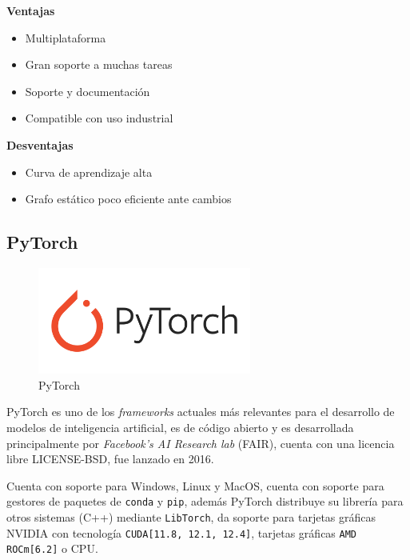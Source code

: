\begin{minipage}[t]{0.45\textwidth}
    \centering
    \textbf{Ventajas} \\[1ex]
    \begin{itemize}
        \item Multiplataforma
        \item Gran soporte a muchas tareas
        \item Soporte y documentación
        \item Compatible con uso industrial
    \end{itemize}
\end{minipage}%
\hfill
\begin{minipage}[t]{0.45\textwidth}
    \centering
    \textbf{Desventajas} \\[1ex]
    \begin{itemize}
        \item Curva de aprendizaje alta
        \item Grafo estático poco eficiente ante cambios
    \end{itemize}
\end{minipage}

\subsection{PyTorch}

\begin{figure}[H]
    \centering
    \includegraphics[width=7cm]{figures/assets/Logo_PyTorch.png}
    \caption{PyTorch}
    \label{fig:lib-pytorch}
\end{figure}

PyTorch \cite{Ansel_PyTorch_2_Faster_2024} es uno de los \textit{frameworks} actuales más relevantes para el desarrollo de modelos de inteligencia artificial, es de código abierto y es desarrollada principalmente por \textit{Facebook's AI Research lab} (FAIR), cuenta con una licencia libre \gls{LICENSE-BSD}, fue lanzado en 2016. 

Cuenta con soporte para Windows, Linux y MacOS, cuenta con soporte para gestores de paquetes de \texttt{conda} y \texttt{pip}, además PyTorch distribuye su librería para otros sistemas (C++) mediante \texttt{LibTorch}, da soporte para tarjetas gráficas NVIDIA con tecnología \texttt{CUDA[11.8, 12.1, 12.4]}, tarjetas gráficas \texttt{AMD ROCm[6.2]} o \gls{CPU}.

